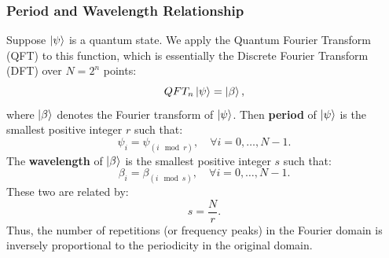 \subsubsection{Period and Wavelength Relationship} 
\begin{theorem}
Suppose $\ket{\psi}$ is a quantum state. We apply the Quantum Fourier Transform (QFT) to this function, which is essentially the Discrete Fourier Transform (DFT) over $N=2^n$ points:
\[
QFT_n \ket{\psi} = \ket{\beta},
\]
where $\ket{\beta}$ denotes the Fourier transform of $\ket{\psi}$. Then \textbf{period} of $\ket{\psi}$ is the smallest positive integer $r$ such that:
\[
\psi_{i} = \psi_{(i\mod r)}, \quad \forall i=0,\ldots,N-1.
\]
The \textbf{wavelength} of $\ket{\beta}$ is the smallest positive integer $s$ such that:
\[
\beta_i=\beta_{(i \mod s)}, \quad \forall i=0,\ldots,N-1. 
\]
These two are related by:
\[
s = \frac{N}{r}.
\]
Thus, the number of repetitions (or frequency peaks) in the Fourier domain is inversely proportional to the periodicity in the original domain.
\end{theorem}
